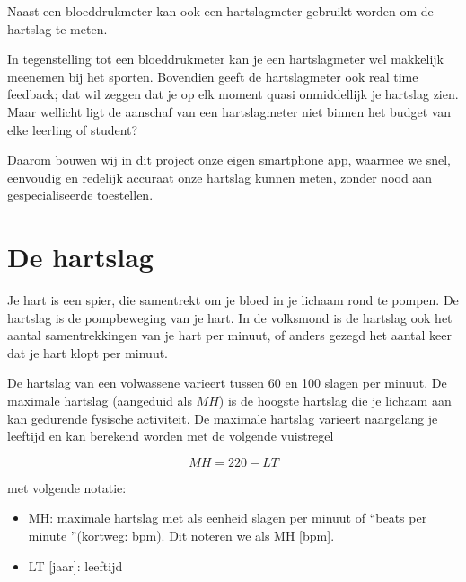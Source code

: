 Naast een bloeddrukmeter kan ook een hartslagmeter gebruikt worden om de hartslag te meten. 

\begin{minipage}{.5\linewidth}
\end{minipage} 
\begin{minipage}{.5\linewidth}
\end{minipage} 

In tegenstelling tot een bloeddrukmeter kan je een hartslagmeter wel makkelijk meenemen bij het sporten. Bovendien geeft de hartslagmeter ook real time feedback; dat wil zeggen dat je op elk moment quasi onmiddellijk je hartslag zien. Maar wellicht ligt de aanschaf van een hartslagmeter niet binnen het budget van elke leerling of student?

Daarom bouwen wij in dit project onze eigen smartphone app, waarmee we snel, eenvoudig en redelijk accuraat onze hartslag kunnen meten, zonder nood aan gespecialiseerde toestellen.


\section{De hartslag}
\label{sec:Mod1_Sec2}

Je hart is een spier, die samentrekt om je bloed in je lichaam rond te pompen. De hartslag is de pompbeweging van je hart. In de volksmond is de hartslag ook het aantal samentrekkingen van je hart per minuut, of anders gezegd het aantal keer dat je hart klopt per minuut.

De hartslag van een volwassene varieert tussen 60 en 100 slagen per minuut. De maximale hartslag (aangeduid als $MH$) is de hoogste hartslag die je lichaam aan kan gedurende fysische activiteit. De maximale hartslag varieert naargelang je leeftijd en kan berekend worden met de volgende vuistregel

\begin{equation*}
MH = 220-LT
\end{equation*}

met volgende notatie:
\begin{itemize}
	\item MH: maximale hartslag met als eenheid slagen per minuut of \textquotedblleft beats per minute \textquotedblright (kortweg: bpm). 
	Dit noteren we als MH [bpm].
	\item LT [jaar]: leeftijd
\end{itemize}

